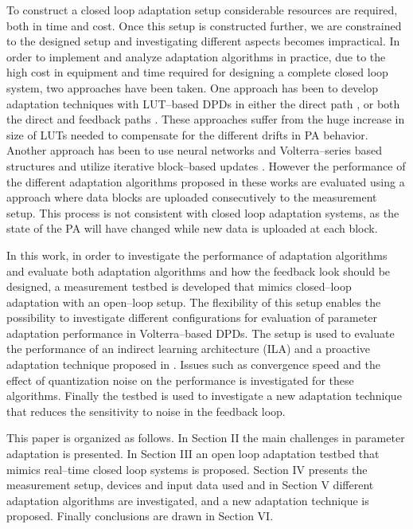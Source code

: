 \documentclass[journal]{IEEEtran}
\begin{document}
To construct a closed loop adaptation setup considerable resources are required, both in time and cost. Once this setup is constructed further, we are constrained to the designed setup and investigating different aspects becomes impractical. In order to implement and analyze adaptation algorithms in practice, due to the high cost in equipment and time required for designing a complete closed loop system, two approaches have been taken. One approach has been to develop adaptation techniques with LUT--based DPDs in either the direct path \cite{faulkner,chung2007,gilabert2008,presti}, or both the direct and feedback paths \cite{boo2009,woo2007,kim2010}. These approaches suffer from the huge increase in size of LUTs needed to compensate for the different drifts in PA behavior. Another approach has been to use neural networks and Volterra--series based structures and utilize iterative block--based updates \cite{rawat,liu,braithwaite2008,braithwaite2012}. However the performance of the different adaptation algorithms proposed in these works are evaluated using a approach where data blocks are uploaded consecutively to the measurement setup. This process is not consistent with closed loop adaptation systems, as the state of the PA will have changed while new data is uploaded at each block.

In this work, in order to investigate the performance of adaptation algorithms and evaluate both adaptation algorithms and how the feedback look should be designed, a measurement testbed is developed that mimics closed--loop adaptation with an open--loop setup. The flexibility of this setup enables the possibility to investigate different configurations for evaluation of parameter adaptation performance in Volterra--based DPDs. The setup is used to evaluate the performance of an indirect learning architecture (ILA) and a proactive adaptation technique proposed in \cite{soltaniims}. Issues such as convergence speed and the effect of quantization noise on the performance is investigated for these algorithms. Finally the testbed is used to investigate a new adaptation technique that reduces the sensitivity to noise in the feedback loop.


This paper is organized as follows. In Section II the main challenges in parameter adaptation is presented. In Section III an open loop adaptation testbed that mimics real--time closed loop systems is proposed. Section IV presents the measurement setup, devices and input data used and in Section V different adaptation algorithms are investigated, and a new adaptation technique is proposed. Finally conclusions are drawn in Section VI.
\end{document}
